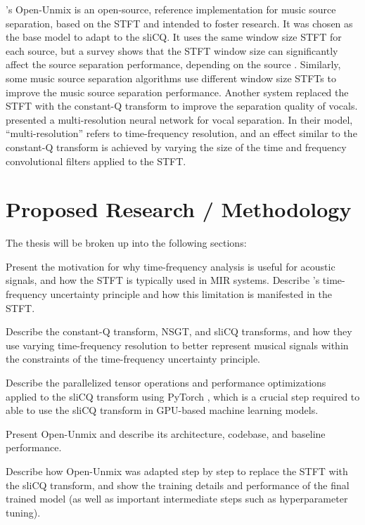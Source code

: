 \documentclass[letter,12pt]{scrartcl}
\newenvironment{tight_enumerate}{
\begin{enumerate}
  \setlength{\itemsep}{0pt}
  \setlength{\parskip}{0pt}
}{\end{enumerate}}
\begin{document}
\citet{umx}'s Open-Unmix is an open-source, reference implementation for music source separation, based on the STFT and intended to foster research. It was chosen as the base model to adapt to the sliCQ. It uses the same window size STFT for each source, but a survey shows that the STFT window size can significantly affect the source separation performance, depending on the source \cite{tftradeoff1}. Similarly, some music source separation algorithms \cite{fitzgerald1, driedger} use different window size STFTs to improve the music source separation performance. Another system \cite{fitzgerald2} replaced the STFT with the constant-Q transform to improve the separation quality of vocals. \citet{plumbley2} presented a multi-resolution neural network for vocal separation. In their model, ``multi-resolution'' refers to time-frequency resolution, and an effect similar to the constant-Q transform is achieved by varying the size of the time and frequency convolutional filters applied to the STFT.

\section{Proposed Research / Methodology}

The thesis will be broken up into the following sections:
\begin{tight_enumerate}
	\item
		Present the motivation for why time-frequency analysis is useful for acoustic signals, and how the STFT is typically used in MIR systems. Describe \citet{gabor1946}'s time-frequency uncertainty principle and how this limitation is manifested in the STFT.
	\item
		Describe the constant-Q transform, NSGT, and sliCQ transforms, and how they use varying time-frequency resolution to better represent musical signals within the constraints of the time-frequency uncertainty principle.
	\item
		Describe the parallelized tensor operations and performance optimizations applied to the sliCQ transform using PyTorch \cite{pytorch}, which is a crucial step required to able to use the sliCQ transform in GPU-based machine learning models.
	\item
		Present Open-Unmix and describe its architecture, codebase, and baseline performance.
	\item
		Describe how Open-Unmix was adapted step by step to replace the STFT with the sliCQ transform, and show the training details and performance of the final trained model (as well as important intermediate steps such as hyperparameter tuning).
\end{tight_enumerate}
\end{document}
